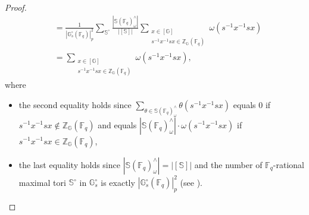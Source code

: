 \documentclass{amsart}
\newcommand{\F}{\mathbb{F}}
\newcommand{\FF}{\mathbb{F}}
\newcommand{\bbS}{\mathbb{S}}
\newcommand{\bbG}{\mathbb{G}}
\newcommand{\bbZ}{\mathbb{Z}}
\theoremstyle{plain}
\theoremstyle{definition}
\theoremstyle{remark}
\theoremstyle{theorem}
\begin{document}
\begin{proof}
\begin{align}
        \nonumber
        &= \frac{1}{|\bbG_s^\circ(\FF_q)|_p^2} \sum_{\bbS^\circ} \frac{|\bbS(\FF_q)^\wedge_\omega|}{|[\bbS]|} \sum_{\substack{x \in [\bbG] \\ s^{-1} x^{-1} s x \in \bbZ_{\bbG}(\FF_q)}} \omega(s^{-1}x^{-1} s x) \\
        \label{eq:mumu'}
        &= \sum_{\substack{x \in [\bbG] \\ s^{-1} x^{-1} s x \in \bbZ_{\bbG}(\FF_q)}} \omega(s^{-1}x^{-1} s x),
    \end{align}
where
\begin{itemize}
\item
the second equality holds since $\sum_{\theta\in\bbS(\F_{q})^{\wedge}_{\omega}}\theta(s^{-1}x^{-1}sx)$ equals $0$ if $s^{-1}x^{-1}sx\notin\bbZ_{\bbG}(\F_{q})$ and equals $|\bbS(\F_{q})^{\wedge}_{\omega}|\cdot\omega(s^{-1}x^{-1}sx)$ if $s^{-1}x^{-1}sx\in\bbZ_{\bbG}(\F_{q})$, 
\item
the last equality holds since $|\bbS(\FF_q)^\wedge_\omega| = |[\bbS]|$ and the number of $\F_{q}$-rational maximal tori $\bbS^\circ$ in $\bbG_s^\circ$ is exactly $|\bbG_s^\circ(\FF_q)|_p^2$ (see \cite[Theorem 3.4.1]{Car85}).
\end{itemize}


\end{proof}
\end{document}
